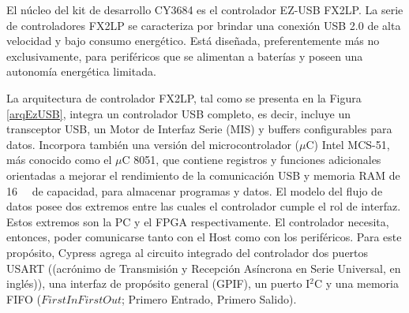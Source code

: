 El núcleo del kit de desarrollo CY3684 es el controlador EZ-USB FX2LP. La serie de controladores FX2LP se caracteriza por brindar una conexión USB 2.0 de alta velocidad y bajo consumo energético. Está diseñada, preferentemente más no exclusivamente, para periféricos que se alimentan a baterías y poseen una autonomía energética limitada.

La arquitectura de controlador FX2LP, tal como se presenta en la Figura \ref{arqEzUSB}, integra un controlador USB completo, es decir, incluye un transceptor USB, un Motor de Interfaz Serie (MIS) y buffers configurables para datos. Incorpora también una versión del microcontrolador ($\mu$C) Intel MCS-51, más conocido como el $\mu$C 8051, que contiene registros y funciones adicionales orientadas a mejorar el rendimiento de la comunicación USB y memoria RAM de \SI{16}{\kilo\byte} de capacidad, para almacenar programas y datos. 
El modelo del flujo de datos posee dos extremos entre las cuales el controlador cumple el rol de interfaz. Estos extremos son la PC y el FPGA respectivamente. El controlador necesita, entonces, poder comunicarse tanto con el Host como con los periféricos. Para este propósito, Cypress agrega al circuito integrado del controlador dos puertos USART ((acrónimo de Transmisión y Recepción Asíncrona en Serie Universal, en inglés)), una interfaz de propósito general (GPIF), un puerto I$^2$C y una memoria FIFO (\(First In First Out\); Primero Entrado, Primero Salido).

